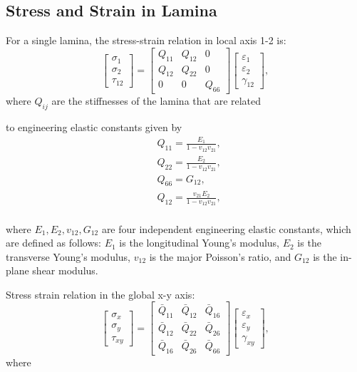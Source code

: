 \documentclass[10pt, journal]{IEEEtran}
\begin{document}
\subsection{Stress and Strain in Lamina}
For a single lamina, the stress-strain relation in local axis 1-2 is:
\begin{equation}
    \begin{bmatrix}
        \sigma _1\\
        \sigma _2\\
        \tau_{12}
    \end{bmatrix}
    =
    \begin{bmatrix}
        Q_{11} & Q_{12} & 0\\
        Q_{12} & Q_{22} & 0\\
        0      &  0     & Q_{66}
    \end{bmatrix}
    \begin{bmatrix}
        \varepsilon_1\\
        \varepsilon_2\\\gamma_{12}
	\end{bmatrix} \textstyle{,}
\end{equation}
where $Q_{ij} $ are the stiffnesses of the lamina that are related

to engineering elastic constants given by
\begin{equation}
    \begin{split}
    &Q_{11}=\frac{E_1}{1-v_{12}v_{21}}\textstyle{,}\\
    &Q_{22}=\frac{E_2}{1-v_{12}v_{21}}\textstyle{,}\\
    &Q_{66}=G_{12}\textstyle{,}\\
    &Q_{12}=\frac{v_{21}E_2}{1-v_{12}v_{21}}\textstyle{,}\\
    \end{split}
\end{equation}

where $E_1, E_2, v_{12}, G_{12} $ are four independent engineering elastic constants, which are defined as follows: $E_1 $ is the longitudinal Young's modulus, $E_2 $ is the transverse Young's modulus, $v_{12} $ is the major Poisson's ratio, and $G_{12} $ is the in-plane shear modulus.

Stress strain relation in the global x-y axis:
\begin{equation}
	\left[\begin{array}{l}\sigma _{x} \\ 
		\sigma _{y} \\ 
		\tau_{xy}
	\end{array}\right]=
	\left[\begin{array}{lll}
		\bar{Q}_{11} & \bar{Q}_{12} & \bar{Q}_{16}\\ 
	    \bar{Q}_{12} & \bar{Q}_{22} & \bar{Q}_{26} \\ 
	    \bar{Q}_{16} & \bar{Q}_{26} &\bar{Q}_{66}
	\end{array}\right]\left[\begin{array}{l}\varepsilon_{x} \\ 
	\varepsilon_{y}\\ \gamma_{x y}\end{array}\right] \textstyle{,}
\end{equation}
where
\end{document}
